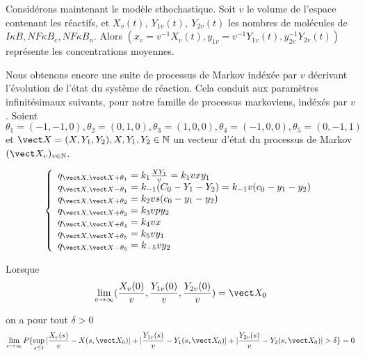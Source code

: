 \documentclass{article}
\begin{document}
Consid{\'e}rons maintenant le mod{\`e}le sthochastique. Soit $v$ le volume de l'espace contenant les r{\'e}actifs, et $X_v(t), ~Y_{1v}(t),~Y_{2v}(t)$ les nombres de mol{\'e}cules de $I\kappa B, NF\kappa B_c, NF\kappa B_n$. Alors $(x_v=v^{-1}X_v(t),y_{1v}=v^{-1}Y_{1v}(t),y_{2v}^{-1}Y_{2v}(t))$ repr{\'e}sente les concentrations moyennes.

Nous obtenons encore une suite de processus de Markov ind{\'e}x{\'e}e par $v$ d{\'e}crivant
l'{\'e}volution de l'{\'e}tat du syst{\`e}me de r{\'e}action.
Cela conduit aux param{\`e}tres infinit{\'e}simaux suivants, pour notre famille de
processus markoviens, ind{\'e}x{\'e}s par $v$. Soient \[
\theta_1=(-1,-1,0), \theta_2=(0,1,0), \theta_3=(1,0,0), \theta_4=(-1,0,0),\theta_5=(0,-1,1) \]
 et $\vect X=(X,Y_1,Y_2), X,Y_1,Y_2 \in \mathbb{N}$ un vecteur d'{\'e}tat du processus de
 Markov $(\vect X_v)_{v\in\mathbb{N}} $.


\[
  \left \{
 \begin{array}{ll}
q_{\vect X,\vect X +\theta_1}  = k_1\frac{XY_1}{v} = k_1vxy_{1} \\
q_{\vect X,\vect X -\theta_1}  = k_{-1}(C_0-Y_1-Y_2) = k_{-1}v(c_0-y_{1}-y_{2}) \\
q_{\vect X ,\vect X +\theta_2} = k_{2}vs(c_0-y_{1}-y_{2}) \\
q_{\vect X ,\vect X +\theta_3}  =  k_{3}vpy_{2} \\
q_{\vect X ,\vect X +\theta_4}  = k_4vx   \\
q_{\vect X ,\vect X +\theta_5} = k_5vy_{1}\\
q_{\vect X ,\vect X -\theta_5} = k_{-5}vy_{2}
\end{array} \right.
\]


Lorsque
\[\lim_{v\rightarrow \infty}(\frac{X_v(0)}{v},\frac{Y_{1v}(0)}{v},\frac{Y_{2v}(0)}{v}) = \vect X_0\]

on a pour tout $\delta >0$
\[
 \lim_{v\rightarrow \infty}P\{\sup_{s\le t} \arrowvert \frac{X_v(s)}{v}-X(s,\vect X_0)\arrowvert +\arrowvert\frac{Y_{1v}(s)}{v}-Y_1(s,\vect X_0)\arrowvert + \arrowvert \frac{Y_{2v}(s)}{v}-Y_2(s,\vect X_0)\arrowvert >\delta\} = 0
\]


\end{document}
